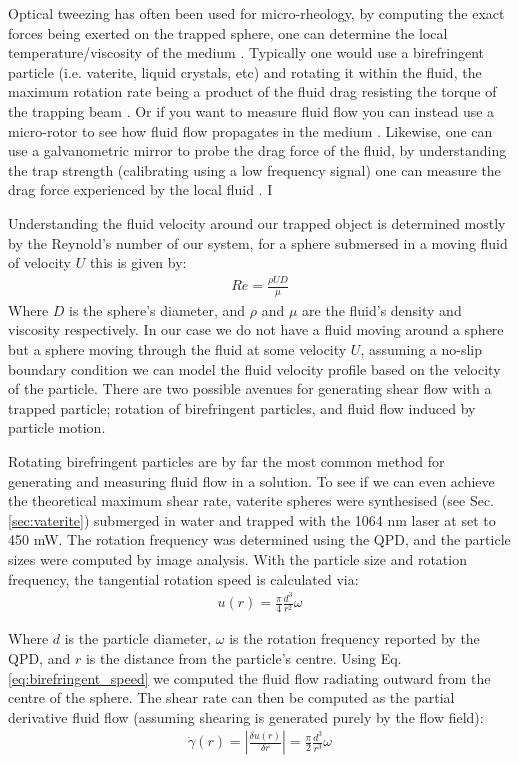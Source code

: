 Optical tweezing has often been used for micro-rheology, by computing the
exact forces being exerted on the trapped sphere, one can determine the
local temperature/viscosity of the medium \cite{Millen2014, RodriguezSevilla2018}.
Typically one would use a birefringent particle (i.e. vaterite, liquid
crystals, etc) and rotating it within the fluid, the maximum rotation
rate being a product of the fluid drag resisting the torque of the 
trapping beam \cite{RodriguezSevilla2018}. Or if you want to measure 
fluid flow you can instead use a micro-rotor to see how fluid flow 
propagates in the medium \cite{Knoener2005}. Likewise, one can use 
a galvanometric mirror to probe the drag force of the fluid, by 
understanding the trap strength (calibrating using a low frequency 
signal) one can measure the drag force experienced by the local fluid \cite{RobertsonAnderson2018}. I

Understanding the fluid velocity around our trapped object is determined 
mostly by the Reynold's number of our system, for a sphere submersed 
in a moving fluid of velocity $U$ this is given by:
\begin{align}
	Re = \frac{\rho UD}{\mu}
\end{align}
Where $D$ is the sphere's diameter, and $\rho$ and $\mu$ are the fluid's density and viscosity respectively. In our case we do not have a fluid moving around a sphere but a sphere moving through the fluid at some velocity $U$, assuming a no-slip boundary condition we can model the fluid velocity profile based on the velocity of the particle. There are two possible avenues for generating shear flow with a trapped particle; rotation of birefringent particles, and fluid flow induced by particle motion. 

Rotating birefringent particles are by far the most common method for generating and measuring fluid flow in a solution. To see if we can even achieve the theoretical maximum shear rate, vaterite spheres were synthesised (see Sec.\ref{sec:vaterite}) submerged in water and trapped with the 1064 nm laser at set to 450 mW. The rotation frequency was determined using the QPD, and the particle sizes were computed by image analysis. With the particle size and rotation frequency, the tangential rotation speed is calculated via:
\begin{align}
	\label{eq:birefringent_speed}
	u(r) = \frac{\pi}{4}\frac{d^3}{r^2}\omega
\end{align}

Where $d$ is the particle diameter, $\omega$ is the rotation frequency
reported by the QPD, and $r$ is the distance from the particle's centre. 
Using Eq.\ref{eq:birefringent_speed} we computed the fluid flow radiating
outward from the centre of the sphere. The shear rate can then be computed
as the partial derivative fluid flow (assuming shearing is generated purely
by the flow field):
\begin{align}
	\label{eq:birefringent_shear}
	\dot{\gamma}(r)=\left|\frac{\delta u(r)}{\delta r} \right|= \frac{\pi}{2}\frac{d^3}{r^3}\omega
\end{align}

